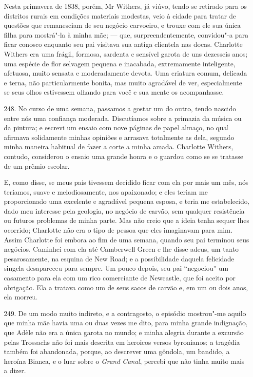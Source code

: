 Nesta primavera de 1838, porém, Mr Withers, já viúvo, tendo se retirado
para os distritos rurais em condições materiais modestas, veio à cidade
para tratar de questões que remanesciam de seu negócio carvoeiro, e
trouxe com ele sua única filha para mostrá"-la à minha mãe; --- que,
surpreendentemente, convidou"-a para ficar conosco enquanto seu pai
visitava sua antiga clientela nas docas. Charlotte Withers era uma
frágil, formosa, sardenta e sensível garota de uns dezesseis anos; uma
espécie de flor selvagem pequena e inacabada, extremamente inteligente,
afetuosa, muito sensata e moderadamente devota. Uma criatura comum,
delicada e terna, não particularmente bonita, mas muito agradável de
ver, especialmente se seus olhos estivessem olhando para você e sua
mente os acompanhasse.

248. No curso de uma semana, passamos a gostar um do outro, tendo
nascido entre nós uma confiança moderada. Discutíamos sobre a primazia
da música ou da pintura; e escrevi um ensaio com nove páginas de papel
almaço, no qual afirmava solidamente minhas opiniões e arrasava
totalmente as dela, segundo minha maneira habitual de fazer a corte a
minha amada. Charlotte Withers, contudo, considerou o ensaio uma grande
honra e o guardou como se se tratasse de um prêmio escolar.

E, como disse, se meus pais tivessem decidido ficar com ela por mais um
mês, nós teríamos, suave e melodiosamente, nos apaixonado; e eles teriam
me proporcionado uma excelente e agradável pequena esposa, e teria me
estabelecido, dado meu interesse pela geologia, no negócio de carvão,
sem qualquer resistência ou futuros problemas de minha parte. Mas não
creio que a ideia tenha sequer lhes ocorrido; Charlotte não era o tipo
de pessoa que eles imaginavam para mim. Assim Charlotte foi embora ao
fim de uma semana, quando seu pai terminou seus negócios. Caminhei com
ela até Camberwell Green e lhe disse adeus, um tanto pesarosamente, na
esquina de New Road; e a possibilidade daquela felicidade singela
desapareceu para sempre. Um pouco depois, seu pai ``negociou'' um
casamento para ela com um rico comerciante de Newcastle, que foi aceito
por obrigação. Ela a tratava como um de seus sacos de carvão e, em um ou
dois anos, ela morreu.

249. De um modo muito indireto, e a contragosto, o episódio mostrou"-me
aquilo que minha mãe havia uma ou duas vezes me dito, para minha grande
indignação, que Adèle não era a única garota no mundo; e minha alegria
durante a excursão pelas Trossachs não foi mais descrita em heroicos
versos byronianos; a tragédia também foi abandonada, porque, ao
descrever uma gôndola, um bandido, a heroína Bianca, e o luar sobre o
\emph{Grand Canal}, percebi que não tinha muito mais a dizer.

